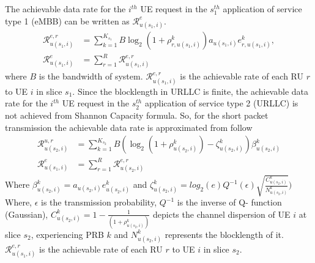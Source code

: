 \documentclass[conference]{IEEEtran}
\begin{document}
The achievable data rate for the $i^{th}$ UE request in the $s_{1}^{th}$ application of service type 1 (eMBB) can be written as $\mathcal{R}_{u(s_1,i)}^{e}$.
\begin{equation}\label{eq1}
\begin{split}
\mathcal{R}_{u(s_1,i)}^{e,r} &= \sum_{k=1}^{K_{s_1}} B \log_2({1+ \rho_{r,u(s_1,i)}^{k}})a_{u(s_1,i)} e^k_{r,u(s_1,i)},\\
\mathcal{R}_{u(s_1,i)}^{e} &= \sum_{r=1}^{R}\mathcal{R}_{u(s_1,i)}^{e,r} 
\end{split}
\end{equation}
where $B$ is the bandwidth of system. 
$\mathcal{R}_{u(s_1,i)}^{e,r}$ is the achievable rate of each RU $r$ to UE $i$ in slice $s_1$.
Since the blocklength in URLLC is finite, the achievable data rate for the $i^{th}$ UE request in the $s_{2}^{th}$ application of service type 2 (URLLC) is not achieved from Shannon Capacity formula. So, for the short packet transmission the achievable data rate is approximated from follow
\begin{equation}\label{eq11}
\begin{split}
\mathcal{R}_{u(s_2,i)}^{u,r} &= \sum_{k=1}^{K_{s_2}} B (\log_2({1+ \rho_{u(s_2,i)}^{k}})- \zeta_{u(s_2,i)}^{k}){\beta}_{u(s_2,i)}^{k}\\
\mathcal{R}_{u(s_1,i)}^{e} &= \sum_{r=1}^{R}\mathcal{R}_{u(s_2,i)}^{e,r} 
\end{split}
\end{equation}
Where ${\beta}_{u(s_2,i)}^{k}=a_{u(s_2,i)} e^{k}_{u(s_2,i)}$
and $\zeta_{u(s_2,i)}^{k} = log_2({e})Q^{-1}(\epsilon) \sqrt{\frac{C_{u(s_2,i)}^{k}}{N_{u(s_2,i)}^{k}}})$
Where, $\epsilon $ is the transmission probability, $Q^{-1}$ is the inverse of Q- function (Gaussian),
$C_{u(s_2,i)}^{k} = 1 - \frac{1}{(1+\rho_{u(s_2,i)}^{k})}$ depicts the channel dispersion of UE  $i$ at slice $s_2$, experiencing PRB $k$ and
$N_{u(s_2,i)}^{k}$ represents the blocklength of it. 
$\mathcal{R}_{u(s_1,i)}^{e,r}$ is the achievable rate of each RU $r$ to UE $i$ in slice $s_2$.
\end{document}
